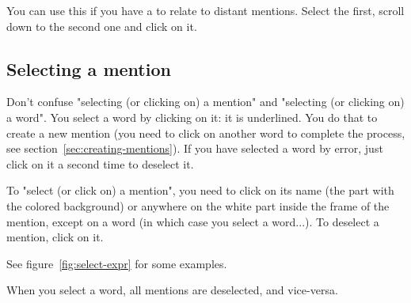 \documentclass[12pt]{article}
\begin{document}
You can use this if you have a to relate to distant mentions.  Select the
first, scroll down to the second one and click on it.

 \subsection{Selecting a mention}

Don't confuse "selecting (or clicking on) a mention" and "selecting (or
clicking on) a word".  You select a word by clicking on it: it is underlined.
You do that to create a new mention (you need to click on another word to
complete the process, see section~\ref{sec:creating-mentions}).  If you have
selected a word by error, just click on it a second time to deselect it.

To "select (or click on) a mention", you need to click on its name (the part
with the colored background) or anywhere on the white part inside the frame
of the mention, except on a word (in which case you select a word...).  To
deselect a mention, click on it.

See figure~\ref{fig:select-expr} for some examples.

When you select a word, all mentions are deselected, and vice-versa.
\end{document}
